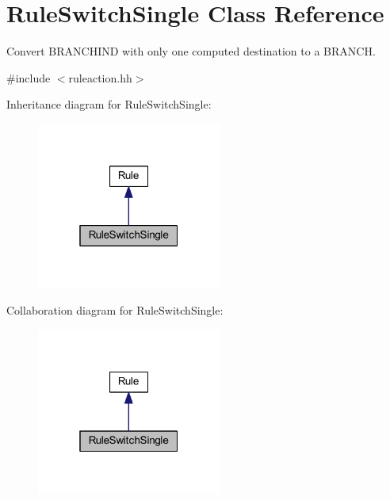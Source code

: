 \hypertarget{class_rule_switch_single}{}\section{Rule\+Switch\+Single Class Reference}
\label{class_rule_switch_single}


Convert B\+R\+A\+N\+C\+H\+I\+ND with only one computed destination to a B\+R\+A\+N\+CH.  




{\ttfamily \#include $<$ruleaction.\+hh$>$}



Inheritance diagram for Rule\+Switch\+Single\+:
\nopagebreak
\begin{figure}[H]
\begin{center}
\leavevmode
\includegraphics[width=172pt]{class_rule_switch_single__inherit__graph}
\end{center}
\end{figure}


Collaboration diagram for Rule\+Switch\+Single\+:
\nopagebreak
\begin{figure}[H]
\begin{center}
\leavevmode
\includegraphics[width=172pt]{class_rule_switch_single__coll__graph}
\end{center}
\end{figure}
